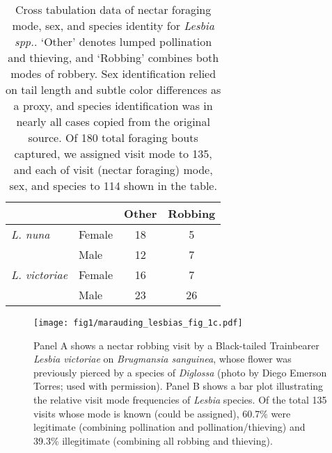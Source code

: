 \documentclass[fleqn,10pt,lineno]{wlpeerj}
\begin{document}
\clearpage




\clearpage

\begin{table}[ht]
\caption{\label{tab:contingency-table} Cross tabulation data of nectar foraging mode, sex, and species identity for \textit{Lesbia spp.}. `Other' denotes lumped pollination and thieving, and `Robbing' combines both modes of robbery. Sex identification relied on tail length and subtle color differences as a proxy, and species identification was in nearly all cases copied from the original source. Of 180 total foraging bouts captured, we assigned visit mode to 135, and each of visit (nectar foraging) mode, sex, and species to 114 shown in the table.}
\centering
\begin{tabular}{@{\vrule height 8pt depth 4pt width 0pt}llcc}
           			& 		& Other 	& Robbing \\ \hline
    {\em L. nuna} 	& Female 	& 18 	& 5 \\
    				& Male 	& 12 	& 7 \\ \hline
   {\em L. victoriae} 	& Female 	& 16 	& 7 \\
    				& Male 	& 23	& 26 \\ \hline
\end{tabular}
\end{table}
\clearpage




\begin{figure}[ht]
\centering
\texttt{[image: fig1/marauding\_lesbias\_fig\_1c.pdf]}
\caption{Panel A shows a nectar robbing visit by a Black-tailed Trainbearer \textit{Lesbia victoriae} on \textit{Brugmansia sanguinea}, whose flower was previously pierced by a species of \textit{Diglossa} (photo by Diego Emerson Torres; used with permission). Panel B shows a bar plot illustrating the relative visit mode frequencies of \textit{Lesbia} species. Of the total 135 visits whose mode is known (could be assigned), 60.7\% were legitimate (combining pollination and pollination/thieving) and 39.3\% illegitimate (combining all robbing and thieving).}
\label{fig:fig1}
\end{figure}
\end{document}
